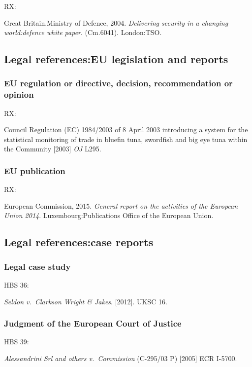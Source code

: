 RX: \cite{gb.cm6041}

Great Britain.\@ Ministry of Defence, 2004. \emph{Delivering security in a changing world:\@ defence white paper}. (Cm.\@ 6041). London:\@ TSO.



\subsection{Legal references:\@ EU legislation and reports}


\subsubsection*{EU regulation or directive, decision, recommendation or opinion}

RX: \cite{eu.dir1984/2003}

Council Regulation (EC) 1984/2003 of 8 April 2003 introducing a system for the statistical monitoring of trade in bluefin tuna, swordfish and big eye tuna within the Community [2003] \emph{OJ} L295.




\subsubsection*{EU publication}

RX: \cite{ec2015gra}

European Commission, 2015. \emph{General report on the activities of the European Union 2014}. Luxembourg:\@ Publications Office of the European Union.



\subsection{Legal references:\@ case reports}

\subsubsection*{Legal case study}

HBS 36: \cite{seldon-v-c.w.j2012}

\emph{Seldon v.~Clarkson Wright \& Jakes}. [2012]. UKSC 16.



\subsubsection*{Judgment of the European Court of Justice}

HBS 39: \cite{srl.etal-v-comm2005}

\emph{Alessandrini Srl and others v.~Commission} (C-295/03 P) [2005] ECR I-5700.


